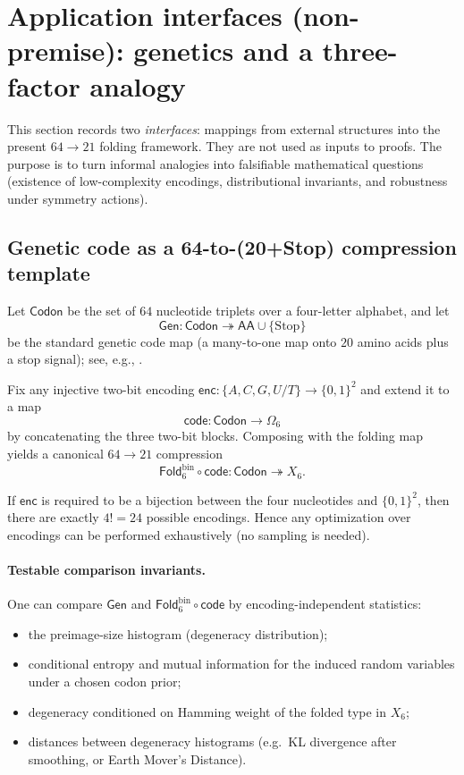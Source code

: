 
\section{Application interfaces (non-premise): genetics and a three-factor analogy}
\label{sec:applications}

This section records two \emph{interfaces}: mappings from external structures into the present $64\to 21$ folding framework.
They are not used as inputs to proofs.
The purpose is to turn informal analogies into falsifiable mathematical questions (existence of low-complexity encodings, distributional invariants, and robustness under symmetry actions).

\subsection{Genetic code as a 64-to-(20+Stop) compression template}
Let $\mathsf{Codon}$ be the set of $64$ nucleotide triplets over a four-letter alphabet, and let
\[
\mathsf{Gen}:\mathsf{Codon}\twoheadrightarrow \mathsf{AA}\cup\{\mathrm{Stop}\}
\]
be the standard genetic code map (a many-to-one map onto $20$ amino acids plus a stop signal); see, e.g., \cite{Alberts2014MBoC}.

Fix any injective two-bit encoding $\mathsf{enc}:\{A,C,G,U/T\}\to\{0,1\}^2$ and extend it to a map
\[
\mathsf{code}:\mathsf{Codon}\to\Omega_6
\]
by concatenating the three two-bit blocks.
Composing with the folding map yields a canonical $64\to 21$ compression
\[
\mathsf{Fold}^{\mathrm{bin}}_6\circ \mathsf{code}:\mathsf{Codon}\twoheadrightarrow X_6.
\]

\begin{remark}
If $\mathsf{enc}$ is required to be a bijection between the four nucleotides and $\{0,1\}^2$, then there are exactly $4!=24$ possible encodings.
Hence any optimization over encodings can be performed exhaustively (no sampling is needed).
\end{remark}

\paragraph{Testable comparison invariants.}
One can compare $\mathsf{Gen}$ and $\mathsf{Fold}^{\mathrm{bin}}_6\circ \mathsf{code}$ by encoding-independent statistics:
\begin{itemize}
\item the preimage-size histogram (degeneracy distribution);
\item conditional entropy and mutual information for the induced random variables under a chosen codon prior;
\item degeneracy conditioned on Hamming weight of the folded type in $X_6$;
\item distances between degeneracy histograms (e.g.\ KL divergence after smoothing, or Earth Mover's Distance).
\end{itemize}

